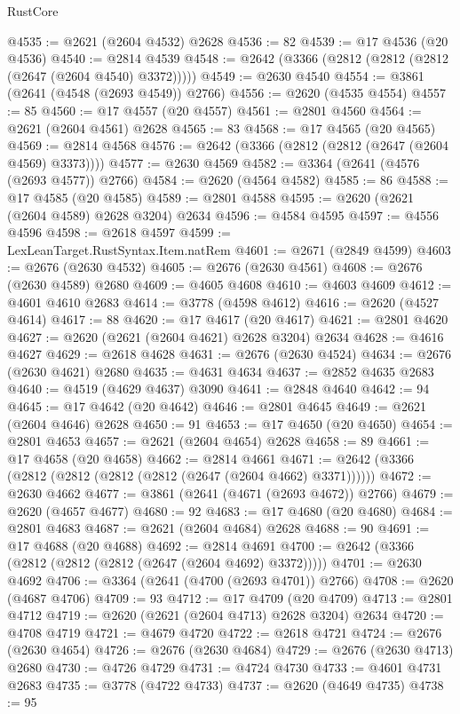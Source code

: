\begin{lexlean}{RustCore}
\begin{coremodule}
@4535 := @2621 (@2604 @4532) @2628
@4536 := 82
@4539 := @17 @4536 (@20 @4536)
@4540 := @2814 @4539
@4548 := @2642 (@3366 (@2812 (@2812 (@2812 (@2647 (@2604 @4540) @3372)))))
@4549 := @2630 @4540
@4554 := @3861 (@2641 (@4548 (@2693 @4549)) @2766)
@4556 := @2620 (@4535 @4554)
@4557 := 85
@4560 := @17 @4557 (@20 @4557)
@4561 := @2801 @4560
@4564 := @2621 (@2604 @4561) @2628
@4565 := 83
@4568 := @17 @4565 (@20 @4565)
@4569 := @2814 @4568
@4576 := @2642 (@3366 (@2812 (@2812 (@2647 (@2604 @4569) @3373))))
@4577 := @2630 @4569
@4582 := @3364 (@2641 (@4576 (@2693 @4577)) @2766)
@4584 := @2620 (@4564 @4582)
@4585 := 86
@4588 := @17 @4585 (@20 @4585)
@4589 := @2801 @4588
@4595 := @2620 (@2621 (@2604 @4589) @2628 @3204) @2634
@4596 := @4584 @4595
@4597 := @4556 @4596
@4598 := @2618 @4597
@4599 := LexLeanTarget.RustSyntax.Item.natRem
@4601 := @2671 (@2849 @4599)
@4603 := @2676 (@2630 @4532)
@4605 := @2676 (@2630 @4561)
@4608 := @2676 (@2630 @4589) @2680
@4609 := @4605 @4608
@4610 := @4603 @4609
@4612 := @4601 @4610 @2683
@4614 := @3778 (@4598 @4612)
@4616 := @2620 (@4527 @4614)
@4617 := 88
@4620 := @17 @4617 (@20 @4617)
@4621 := @2801 @4620
@4627 := @2620 (@2621 (@2604 @4621) @2628 @3204) @2634
@4628 := @4616 @4627
@4629 := @2618 @4628
@4631 := @2676 (@2630 @4524)
@4634 := @2676 (@2630 @4621) @2680
@4635 := @4631 @4634
@4637 := @2852 @4635 @2683
@4640 := @4519 (@4629 @4637) @3090
@4641 := @2848 @4640
@4642 := 94
@4645 := @17 @4642 (@20 @4642)
@4646 := @2801 @4645
@4649 := @2621 (@2604 @4646) @2628
@4650 := 91
@4653 := @17 @4650 (@20 @4650)
@4654 := @2801 @4653
@4657 := @2621 (@2604 @4654) @2628
@4658 := 89
@4661 := @17 @4658 (@20 @4658)
@4662 := @2814 @4661
@4671 := @2642 (@3366 (@2812 (@2812 (@2812 (@2812 (@2647 (@2604 @4662) @3371))))))
@4672 := @2630 @4662
@4677 := @3861 (@2641 (@4671 (@2693 @4672)) @2766)
@4679 := @2620 (@4657 @4677)
@4680 := 92
@4683 := @17 @4680 (@20 @4680)
@4684 := @2801 @4683
@4687 := @2621 (@2604 @4684) @2628
@4688 := 90
@4691 := @17 @4688 (@20 @4688)
@4692 := @2814 @4691
@4700 := @2642 (@3366 (@2812 (@2812 (@2812 (@2647 (@2604 @4692) @3372)))))
@4701 := @2630 @4692
@4706 := @3364 (@2641 (@4700 (@2693 @4701)) @2766)
@4708 := @2620 (@4687 @4706)
@4709 := 93
@4712 := @17 @4709 (@20 @4709)
@4713 := @2801 @4712
@4719 := @2620 (@2621 (@2604 @4713) @2628 @3204) @2634
@4720 := @4708 @4719
@4721 := @4679 @4720
@4722 := @2618 @4721
@4724 := @2676 (@2630 @4654)
@4726 := @2676 (@2630 @4684)
@4729 := @2676 (@2630 @4713) @2680
@4730 := @4726 @4729
@4731 := @4724 @4730
@4733 := @4601 @4731 @2683
@4735 := @3778 (@4722 @4733)
@4737 := @2620 (@4649 @4735)
@4738 := 95

\end{coremodule}
\end{lexlean}
